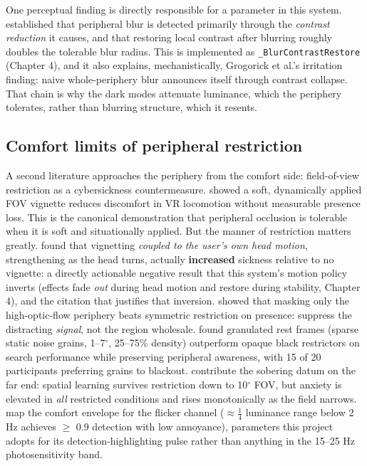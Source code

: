 One perceptual finding is directly responsible for a parameter in this system. \citet{patney2016}
established that peripheral blur is detected primarily through the \textit{contrast reduction} it
causes, and that restoring local contrast after blurring roughly doubles the tolerable blur radius.
This is implemented as \verb|_BlurContrastRestore| (Chapter 4), and it also explains, mechanistically,
Grogorick et al.'s irritation finding: naive whole-periphery blur announces itself through contrast
collapse. That chain is why the dark modes attenuate luminance, which the periphery tolerates, rather
than blurring structure, which it resents.

\subsection{Comfort limits of peripheral restriction}

A second literature approaches the periphery from the comfort side: field-of-view restriction as a
cybersickness countermeasure. \citet{fernandes2016} showed a soft, dynamically applied FOV
vignette reduces discomfort in VR locomotion without measurable presence loss. This is the canonical
demonstration that peripheral occlusion is tolerable when it is soft and situationally applied. But
the manner of restriction matters greatly. \citet{norouzi2018} found that vignetting \textit{coupled to the user's own head motion}, strengthening
as the head turns, actually \textbf{increased} sickness relative to no vignette: a directly actionable
negative result that this system's motion policy inverts (effects fade \textit{out} during head motion and
restore during stability, Chapter 4), and the citation that justifies that inversion. \citet{wu2022} showed that masking only the high-optic-flow periphery beats symmetric restriction
on presence: suppress the distracting \textit{signal}, not the region wholesale. \citet{cao2021} found granulated rest frames (sparse static noise grains, 1–7$^{\circ}$, 25–75\% density)
outperform opaque black restrictors on search performance while preserving peripheral awareness,
with 15 of 20 participants preferring grains to blackout. \citet{barhorstcates2016} contribute the sobering datum on the far end: spatial learning survives restriction down to
10$^{\circ}$ FOV, but anxiety is elevated in \textit{all} restricted conditions and rises monotonically as the field
narrows. \citet{waldner2014} map the comfort envelope for the flicker channel ($\approx \frac{1}{4}$ luminance range
below 2 Hz achieves $\geq$ 0.9 detection with low annoyance), parameters this project adopts for its
detection-highlighting pulse rather than anything in the 15–25 Hz photosensitivity band.

